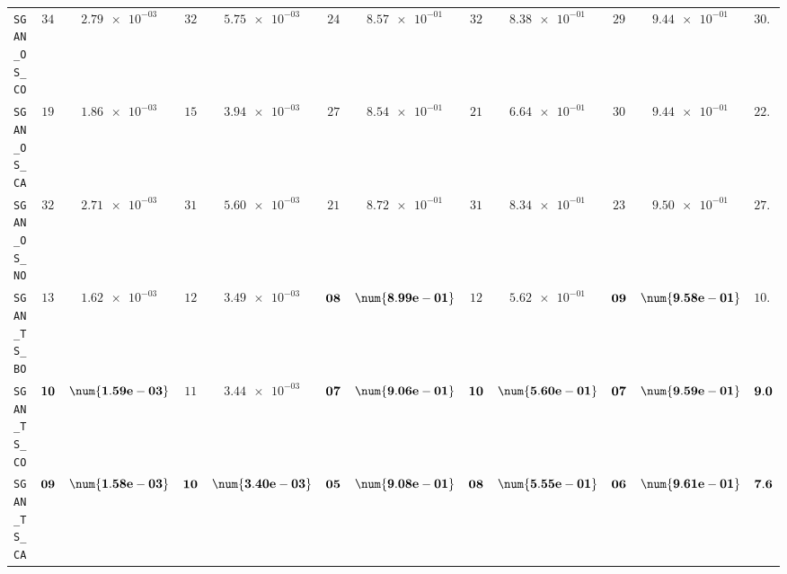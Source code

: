 \begin{table}[H]
\begin{tabularx}{\textwidth}{l||cC|cC|cC|cC|cC||c}
		\texttt{SGAN\_OS\_CO} & $ 34$ & $ \num{2.79e-03}$ & $ 32$ & $ \num{5.75e-03}$ & $ 24$ & $ \num{8.57e-01}$ & $ 32$ & $ \num{8.38e-01}$ & $ 29$ & $ \num{9.44e-01}$ & $ 30.2$  \\
		\texttt{SGAN\_OS\_CA} & $ 19$ & $ \num{1.86e-03}$ & $ 15$ & $ \num{3.94e-03}$ & $ 27$ & $ \num{8.54e-01}$ & $ 21$ & $ \num{6.64e-01}$ & $ 30$ & $ \num{9.44e-01}$ & $ 22.4$  \\
		\texttt{SGAN\_OS\_NO} & $ 32$ & $ \num{2.71e-03}$ & $ 31$ & $ \num{5.60e-03}$ & $ 21$ & $ \num{8.72e-01}$ & $ 31$ & $ \num{8.34e-01}$ & $ 23$ & $ \num{9.50e-01}$ & $ 27.6$  \\
		\texttt{SGAN\_TS\_BO} & $ 13$ & $ \num{1.62e-03}$ & $ 12$ & $ \num{3.49e-03}$ & $\bf 08$ & $\bf \num{8.99e-01}$ & $ 12$ & $ \num{5.62e-01}$ & $\bf 09$ & $\bf \num{9.58e-01}$ & $ 10.8$  \\
		\texttt{SGAN\_TS\_CO} & $\bf 10$ & $\bf \num{1.59e-03}$ & $ 11$ & $ \num{3.44e-03}$ & $\bf 07$ & $\bf \num{9.06e-01}$ & $\bf 10$ & $\bf \num{5.60e-01}$ & $\bf 07$ & $\bf \num{9.59e-01}$ & $\bf 9.0$  \\
		\texttt{SGAN\_TS\_CA} & $\bf 09$ & $\bf \num{1.58e-03}$ & $\bf 10$ & $\bf \num{3.40e-03}$ & $\bf 05$ & $\bf \num{9.08e-01}$ & $\bf 08$ & $\bf \num{5.55e-01}$ & $\bf 06$ & $\bf \num{9.61e-01}$ & $\bf 7.6$  \\

\end{tabularx}
\end{table}
